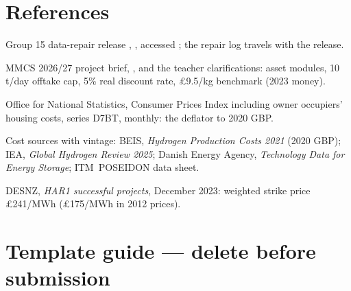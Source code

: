 \documentclass[11pt,a4paper]{article}
\begin{document}
\section*{References}
{\small
\begin{enumerate}[label={[\arabic*]},leftmargin=2.1em]
  \item Group 15 data-repair release , , accessed
        ; the repair log travels with the release.
  \item MMCS 2026/27 project brief, , and the teacher clarifications: asset
        modules, 10\,t/day offtake cap, 5\% real discount rate, £9.5/kg benchmark (2023 money).
  \item Office for National Statistics, Consumer Prices Index including owner occupiers'
        housing costs, series D7BT, monthly: the deflator to 2020 GBP.
  \item Cost sources with vintage: BEIS, \emph{Hydrogen Production Costs 2021} (2020 GBP);
        IEA, \emph{Global Hydrogen Review 2025}; Danish Energy Agency, \emph{Technology Data
        for Energy Storage}; \mbox{ITM POSEIDON} data sheet.
  \item DESNZ, \emph{HAR1 successful projects}, December 2023: weighted strike price
        £241/MWh (£175/MWh in 2012 prices). 
\end{enumerate}}

\vspace{8pt}
\thispagestyle{plain}
\section*{Template guide --- delete before submission}
\end{document}
